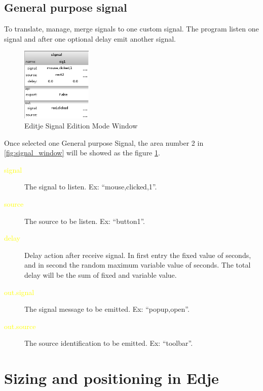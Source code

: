 \documentclass[a4paper]{profusion}
\newcommand{\GUIEditable}[1]{\textcolor{yellow}{#1}} %
\begin{document}
\subsection{General purpose signal}
\label{sec:signal_editing_signal}

	To translate, manage, merge signals to one custom signal. The
program listen one signal and after one optional delay emit another signal.

\begin{figure}
 \centering
 \includegraphics[width=0.3\textwidth]{./images/signal_signal.png}
 \caption{Editje Signal Edition Mode Window}
 \label{fig:signal_signal_edition}
\end{figure}


Once selected one General purpose Signal, the area number 2 in
\ref{fig:signal_window} will be showed as the figure
\ref{fig:signal_signal_edition}.

\begin{description}
 \item[\GUIEditable{signal}] The signal to listen. Ex:
   ``mouse,clicked,1''.
 \item[\GUIEditable{source}] The source to be listen. Ex: ``button1''.
 \item[\GUIEditable{delay}] Delay action after receive signal. In
   first entry the fixed value of seconds, and in second the random
   maximum variable value of seconds.  The total delay will be the sum
   of fixed and variable value.
 \item[\GUIEditable{out.signal}] The signal message to be emitted. Ex:
   ``popup,open''.
 \item[\GUIEditable{out.source}] The source identification to be
   emitted. Ex: ``toolbar''.
\end{description}

\newpage
\appendix
\section{Sizing and positioning in Edje}
\label{app:edje_pos}
\end{document}
